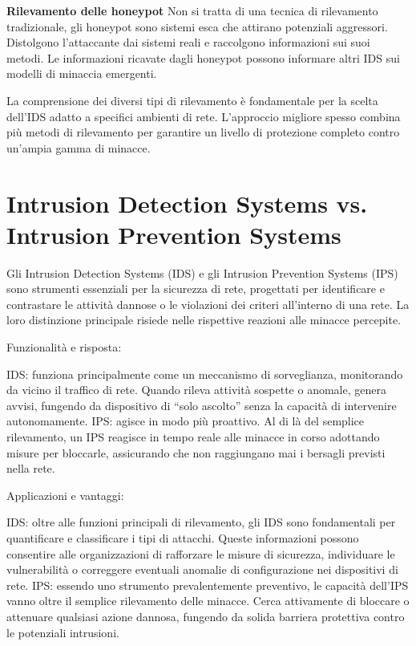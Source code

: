 \textbf{Rilevamento delle honeypot}
Non si tratta di una tecnica di rilevamento tradizionale, gli honeypot sono sistemi esca che attirano potenziali aggressori. Distolgono l’attaccante dai sistemi reali e raccolgono informazioni sui suoi metodi. Le informazioni ricavate dagli honeypot possono informare altri IDS sui modelli di minaccia emergenti.

La comprensione dei diversi tipi di rilevamento è fondamentale per la scelta dell’IDS adatto a specifici ambienti di rete. L’approccio migliore spesso combina più metodi di rilevamento per garantire un livello di protezione completo contro un’ampia gamma di minacce.


\section{Intrusion Detection Systems vs. Intrusion Prevention Systems}
Gli Intrusion Detection Systems (IDS) e gli Intrusion Prevention Systems (IPS) sono strumenti essenziali per la sicurezza di rete, progettati per identificare e contrastare le attività dannose o le violazioni dei criteri all’interno di una rete. La loro distinzione principale risiede nelle rispettive reazioni alle minacce percepite.

Funzionalità e risposta:

IDS: funziona principalmente come un meccanismo di sorveglianza, monitorando da vicino il traffico di rete. Quando rileva attività sospette o anomale, genera avvisi, fungendo da dispositivo di “solo ascolto” senza la capacità di intervenire autonomamente.
IPS: agisce in modo più proattivo. Al di là del semplice rilevamento, un IPS reagisce in tempo reale alle minacce in corso adottando misure per bloccarle, assicurando che non raggiungano mai i bersagli previsti nella rete.
 

Applicazioni e vantaggi:

IDS: oltre alle funzioni principali di rilevamento, gli IDS sono fondamentali per quantificare e classificare i tipi di attacchi. Queste informazioni possono consentire alle organizzazioni di rafforzare le misure di sicurezza, individuare le vulnerabilità o correggere eventuali anomalie di configurazione nei dispositivi di rete.
IPS: essendo uno strumento prevalentemente preventivo, le capacità dell’IPS vanno oltre il semplice rilevamento delle minacce. Cerca attivamente di bloccare o attenuare qualsiasi azione dannosa, fungendo da solida barriera protettiva contro le potenziali intrusioni.
 

